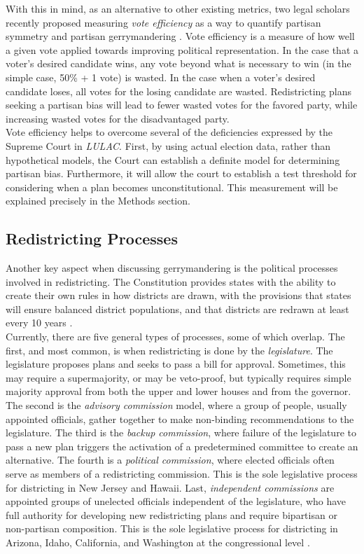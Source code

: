 \documentclass[12pt]{article}
\begin{document}
  With this in mind,  as an alternative to other existing metrics, two legal scholars recently proposed measuring \textit{vote efficiency} as a way to quantify partisan symmetry and partisan gerrymandering \cite{stephanopoulos}.  Vote efficiency is a measure of how well a given vote applied towards improving political representation.  In the case that a voter's desired candidate wins, any vote beyond what is necessary to win (in the simple case, 50\% + 1 vote) is wasted.  In the case when a voter's desired candidate loses, all votes for the losing candidate are wasted. Redistricting plans seeking a partisan bias will lead to fewer wasted votes for the favored party, while increasing wasted votes for the disadvantaged party. \\
  
  Vote efficiency helps to overcome several of the deficiencies expressed by the Supreme Court in \textit{LULAC}.  First, by using actual election data, rather than hypothetical models, the Court can establish a definite model for determining partisan bias.  Furthermore, it will allow the court to establish a test threshold for considering when a plan becomes unconstitutional.  This measurement will be explained precisely in the Methods section.

\subsection{Redistricting Processes}
Another key aspect when discussing gerrymandering is the political processes involved in redistricting.  The Constitution provides states with the ability to create their own rules in how districts are drawn, with the provisions that states will ensure balanced district populations, and that districts are redrawn at least every 10 years \cite{LULAC}.\\

Currently, there are five general types of processes, some of which overlap.  The first, and most common, is when redistricting is done by the \textit{legislature}.    The legislature proposes plans and seeks to pass a bill for approval.  Sometimes, this may require a supermajority, or may be veto-proof, but typically requires simple majority approval from both the upper and lower houses and from the governor.  The second is the \textit{advisory commission} model, where a group of people, usually appointed officials, gather together to make non-binding recommendations to the legislature.  The third is the \textit{backup commission}, where failure of the legislature to pass a new plan triggers the activation of a predetermined committee to create an alternative.  The fourth is a \textit{political commission}, where elected officials often serve as members of a redistricting commission.  This is the sole legislative process for districting in New Jersey and Hawaii.  Last, \textit{independent commissions} are appointed groups of unelected officials independent of the legislature, who have full authority for developing new redistricting plans and require bipartisan or non-partisan composition.  This is the sole legislative process for districting in Arizona, Idaho, California, and Washington at the congressional level \cite{Levitt}. \\
\end{document}

